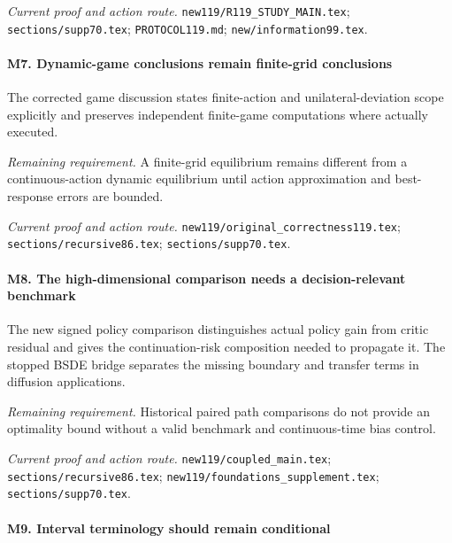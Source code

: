 \par\emph{Current proof and action route.} \nolinkurl{new119/R119_STUDY_MAIN.tex}; \nolinkurl{sections/supp70.tex}; \nolinkurl{PROTOCOL119.md}; \nolinkurl{new/information99.tex}.

\paragraph{M7. Dynamic-game conclusions remain finite-grid conclusions}

The corrected game discussion states finite-action and unilateral-deviation scope explicitly and preserves independent finite-game computations where actually executed.

\par\emph{Remaining requirement.} A finite-grid equilibrium remains different from a continuous-action dynamic equilibrium until action approximation and best-response errors are bounded.

\par\emph{Current proof and action route.} \nolinkurl{new119/original_correctness119.tex}; \nolinkurl{sections/recursive86.tex}; \nolinkurl{sections/supp70.tex}.

\paragraph{M8. The high-dimensional comparison needs a decision-relevant benchmark}

The new signed policy comparison distinguishes actual policy gain from critic residual and gives the continuation-risk composition needed to propagate it. The stopped BSDE bridge separates the missing boundary and transfer terms in diffusion applications.

\par\emph{Remaining requirement.} Historical paired path comparisons do not provide an optimality bound without a valid benchmark and continuous-time bias control.

\par\emph{Current proof and action route.} \nolinkurl{new119/coupled_main.tex}; \nolinkurl{sections/recursive86.tex}; \nolinkurl{new119/foundations_supplement.tex}; \nolinkurl{sections/supp70.tex}.

\paragraph{M9. Interval terminology should remain conditional}

